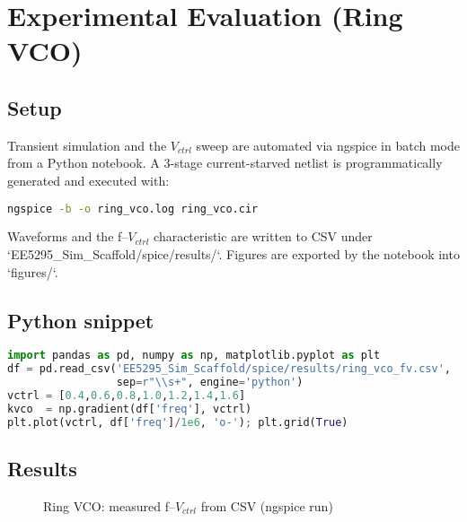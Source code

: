 \section{Experimental Evaluation (Ring VCO)}
\label{sec:ring_vco_experiment}
\subsection*{Setup}
Transient simulation and the \(V_{ctrl}\) sweep are automated via ngspice in batch mode from a Python notebook. A 3-stage current-starved netlist is programmatically generated and executed with:
\begin{lstlisting}[language=bash]
ngspice -b -o ring_vco.log ring_vco.cir
\end{lstlisting}

Waveforms and the f--\(V_{ctrl}\) characteristic are written to CSV under `EE5295_Sim_Scaffold/spice/results/`. Figures are exported by the notebook into `figures/`.

\subsection*{Python snippet}
\begin{lstlisting}[language=Python]
import pandas as pd, numpy as np, matplotlib.pyplot as plt
df = pd.read_csv('EE5295_Sim_Scaffold/spice/results/ring_vco_fv.csv',
                 sep=r"\\s+", engine='python')
vctrl = [0.4,0.6,0.8,1.0,1.2,1.4,1.6]
kvco  = np.gradient(df['freq'], vctrl)
plt.plot(vctrl, df['freq']/1e6, 'o-'); plt.grid(True)
\end{lstlisting}

\subsection*{Results}
\begin{figure}[H]
  \centering
  \caption{Ring VCO: measured f--$V_{ctrl}$ from CSV (ngspice run)}
\end{figure}

